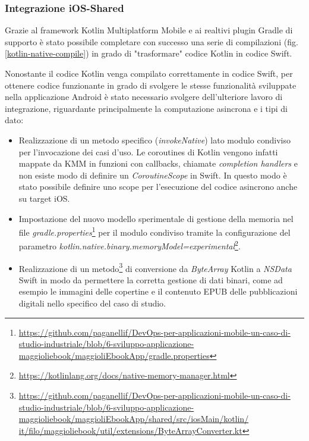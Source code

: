 \subsubsection*{Integrazione iOS-Shared}
Grazie al framework Kotlin Multiplatform Mobile e ai realtivi plugin Gradle di supporto è stato possibile completare con successo una serie di compilazioni (fig. \ref{kotlin-native-compile}) in grado di "trasformare" codice Kotlin in codice Swift.

Nonostante il codice Kotlin venga compilato correttamente in codice Swift, per ottenere codice funzionante in grado di svolgere le stesse funzionalità sviluppate nella applicazione Android è stato necessario svolgere dell'ulteriore lavoro di integrazione, riguardante principalmente la computazione asincrona e i tipi di dato:

\begin{itemize}
    \item Realizzazione di un metodo specifico (\textit{invokeNative}) lato modulo condiviso per l'invocazione dei casi d'uso. Le coroutines di Kotlin vengono infatti mappate da KMM in funzioni con callbacks, chiamate \textit{completion handlers} e non esiste modo di definire un \textit{CoroutineScope} in Swift. In questo modo è stato possibile definire uno scope per l'esecuzione del codice asincrono anche su target iOS.
    \item Impostazione del nuovo modello sperimentale di gestione della memoria nel file \textit{gradle.properties}\footnote{\href{https://github.com/paganellif/DevOps-per-applicazioni-mobile-un-caso-di-studio-industriale/blob/6-sviluppo-applicazione-maggioliebook/maggioliEbookApp/gradle.properties}{https://github.com/paganellif/DevOps-per-applicazioni-mobile-un-caso-di-studio-industriale/blob/6-sviluppo-applicazione-maggioliebook/maggioliEbookApp/gradle.properties}} per il modulo condiviso tramite la configurazione del parametro \textit{kotlin.native.binary.memoryModel=experimental}\footnote{\href{https://kotlinlang.org/docs/native-memory-manager.html}{https://kotlinlang.org/docs/native-memory-manager.html}}.
    \item Realizzazione di un metodo\footnote{\href{https://github.com/paganellif/DevOps-per-applicazioni-mobile-un-caso-di-studio-industriale/blob/6-sviluppo-applicazione-maggioliebook/maggioliEbookApp/shared/src/iosMain/kotlin/it/filo/maggioliebook/util/extensions/ByteArrayConverter.kt}{https://github.com/paganellif/DevOps-per-applicazioni-mobile-un-caso-di-studio-industriale/blob/6-sviluppo-applicazione-maggioliebook/maggioliEbookApp/shared/src/iosMain/kotlin/\\it/filo/maggioliebook/util/extensions/ByteArrayConverter.kt}} di conversione da \textit{ByteArray} Kotlin a \textit{NSData} Swift in modo da permettere la corretta gestione di dati binari, come ad esempio le immagini delle copertine e il contenuto EPUB delle pubblicazioni digitali nello specifico del caso di studio.

\end{itemize}
